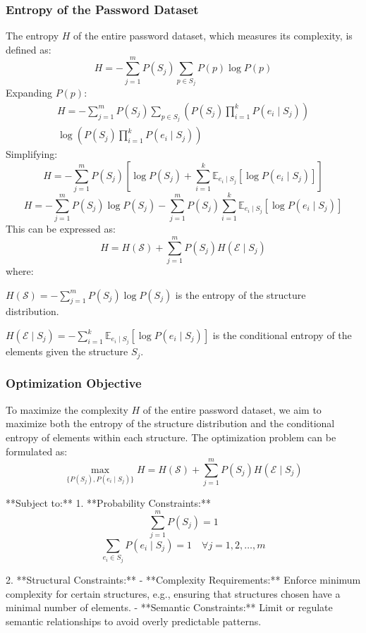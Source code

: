\subsubsection{Entropy of the Password Dataset}

The entropy \( H \) of the entire password dataset, which measures its complexity, is defined as:
\[
H = - \sum_{j=1}^{m} P(S_j) \sum_{p \in S_j} P(p) \log P(p)
\]
Expanding \( P(p) \):
\begin{multline}
H = - \sum_{j=1}^{m} P(S_j) \sum_{p \in S_j} \left( P(S_j) \prod_{i=1}^{k} P(e_i \mid S_j) \right) \\ \log \left( P(S_j) \prod_{i=1}^{k} P(e_i \mid S_j) \right)
\end{multline}
Simplifying:
\[
H = - \sum_{j=1}^{m} P(S_j) \left[ \log P(S_j) + \sum_{i=1}^{k} \mathbb{E}_{e_i \mid S_j} [\log P(e_i \mid S_j)] \right]
\]
\[
H = - \sum_{j=1}^{m} P(S_j) \log P(S_j) - \sum_{j=1}^{m} P(S_j) \sum_{i=1}^{k} \mathbb{E}_{e_i \mid S_j} [\log P(e_i \mid S_j)]
\]
This can be expressed as:
\begin{equation}
H = H(\mathcal{S}) + \sum_{j=1}^{m} P(S_j) H(\mathcal{E} \mid S_j)
\end{equation}
where:

 \( H(\mathcal{S}) = - \sum_{j=1}^{m} P(S_j) \log P(S_j) \) is the entropy of the structure distribution.
 
\( H(\mathcal{E} \mid S_j) = - \sum_{i=1}^{k} \mathbb{E}_{e_i \mid S_j} [\log P(e_i \mid S_j)] \) is the conditional entropy of the elements given the structure \( S_j \).

\subsubsection{Optimization Objective}

To maximize the complexity \( H \) of the entire password dataset, we aim to maximize both the entropy of the structure distribution and the conditional entropy of elements within each structure. The optimization problem can be formulated as:
\begin{equation}
\max_{ \{ P(S_j), P(e_i \mid S_j) \} } H = H(\mathcal{S}) + \sum_{j=1}^{m} P(S_j) H(\mathcal{E} \mid S_j)
\end{equation}

**Subject to:**
1. **Probability Constraints:**
   \[
   \sum_{j=1}^{m} P(S_j) = 1
   \]
   \[
   \sum_{e_i \in S_j} P(e_i \mid S_j) = 1 \quad \forall j = 1, 2, \dots, m
   \]

2. **Structural Constraints:**
   - **Complexity Requirements:** Enforce minimum complexity for certain structures, e.g., ensuring that structures chosen have a minimal number of elements.
   - **Semantic Constraints:** Limit or regulate semantic relationships to avoid overly predictable patterns.


